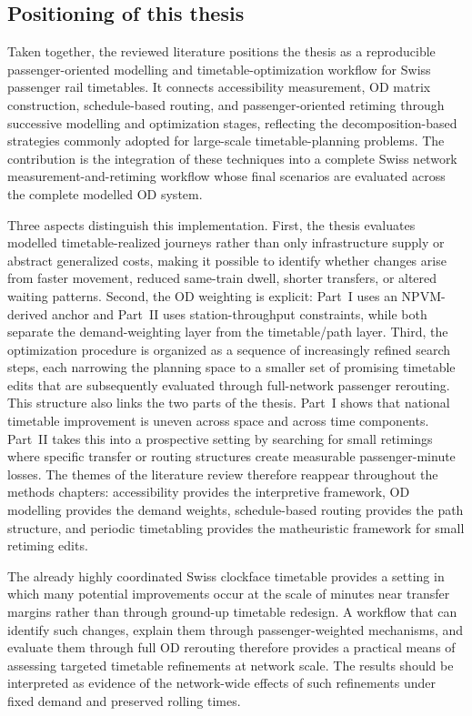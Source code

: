 \documentclass[preprint,12pt]{elsarticle}
\begin{document}
\subsection{Positioning of this thesis}\label{sec:reviewgaps}

Taken together, the reviewed literature positions the thesis as a reproducible passenger-oriented modelling and timetable-optimization workflow for Swiss passenger rail timetables. It connects accessibility measurement, OD matrix construction, schedule-based routing, and passenger-oriented retiming through successive modelling and optimization stages, reflecting the decomposition-based strategies commonly adopted for large-scale timetable-planning problems. The contribution is the integration of these techniques into a complete Swiss network measurement-and-retiming workflow whose final scenarios are evaluated across the complete modelled OD system.

Three aspects distinguish this implementation. First, the thesis evaluates modelled timetable-realized journeys rather than only infrastructure supply or abstract generalized costs, making it possible to identify whether changes arise from faster movement, reduced same-train dwell, shorter transfers, or altered waiting patterns. Second, the OD weighting is explicit: Part~I uses an NPVM-derived anchor and Part~II uses station-throughput constraints, while both separate the demand-weighting layer from the timetable/path layer. Third, the optimization procedure is organized as a sequence of increasingly refined search steps, each narrowing the planning space to a smaller set of promising timetable edits that are subsequently evaluated through full-network passenger rerouting. This structure also links the two parts of the thesis. Part~I shows that national timetable improvement is uneven across space and across time components. Part~II takes this into a prospective setting by searching for small retimings where specific transfer or routing structures create measurable passenger-minute losses. The themes of the literature review therefore reappear throughout the methods chapters: accessibility provides the interpretive framework, OD modelling provides the demand weights, schedule-based routing provides the path structure, and periodic timetabling provides the matheuristic framework for small retiming edits.

The already highly coordinated Swiss clockface timetable provides a setting in which many potential improvements occur at the scale of minutes near transfer margins rather than through ground-up timetable redesign. A workflow that can identify such changes, explain them through passenger-weighted mechanisms, and evaluate them through full OD rerouting therefore provides a practical means of assessing targeted timetable refinements at network scale. The results should be interpreted as evidence of the network-wide effects of such refinements under fixed demand and preserved rolling times.
\end{document}
